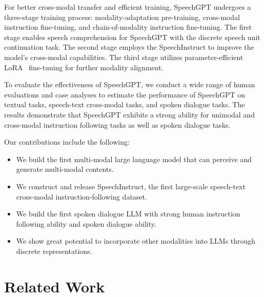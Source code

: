 For better cross-modal transfer and efficient training, SpeechGPT undergoes a three-stage training process: modality-adaptation pre-training, cross-modal instruction fine-tuning, and chain-of-modality instruction fine-tuning. The first stage enables speech comprehension for SpeechGPT with the discrete speech unit continuation task. The second stage employs the SpeechInstruct to improve the model's cross-modal capabilities. The third stage utilizes parameter-efficient LoRA~\citep{hu2021lora} fine-tuning for further modality alignment.

To evaluate the effectiveness of SpeechGPT, we conduct a wide range of human evaluations and case analyses to estimate the performance of SpeechGPT on textual tasks, speech-text cross-modal tasks, and spoken dialogue tasks. The results demonstrate that SpeechGPT exhibits a strong ability for unimodal and cross-modal instruction following tasks as well as spoken dialogue tasks.

Our contributions include the following:
 \begin{itemize}[itemsep=1pt, leftmargin=10pt, parsep=0pt, topsep=1pt]
    \item 
    We build the first multi-modal large language model that can perceive and generate multi-modal contents.

    \item 
    We construct and release SpeechInstruct, the first large-scale speech-text cross-modal instruction-following dataset.

    \item 
    We build the first spoken dialogue LLM with strong human instruction following ability and spoken dialogue ability.

    
    \item 
    We show great potential to incorporate other modalities into LLMs through discrete representations.

    
    
\end{itemize}

 

\section{Related Work}

